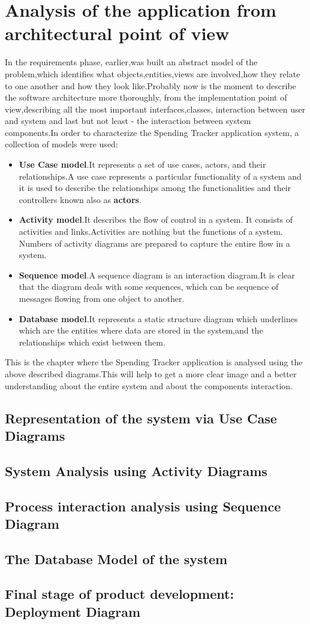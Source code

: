 \section{ Analysis of the application from architectural point of view}
In the requirements phase, earlier,was built an abstract model of the problem,which identifies what objects,entities,views are involved,how they relate to one another and how they look like.Probably now is the moment to describe the software architecture more thoroughly, from the implementation point of view,describing all the most important interfaces,classes, interaction between user and system and last but not least - the interaction between system components.In order to characterize the Spending Tracker application system, a collection of models were used:
\begin{itemize}
	\item \textbf{Use Case model}.It represents a set of use cases, actors, and their relationships.A use case represents a particular functionality of a system and it is used to describe the relationships among the functionalities and their controllers known also as \textbf{actors}.
	\item \textbf{Activity model}.It describes the flow of control in a system. It consists of activities and links.Activities are nothing but the functions of a system. Numbers of activity diagrams are prepared to capture the entire flow in a system.
	\item \textbf{Sequence model}.A sequence diagram is an interaction diagram.It is clear that the diagram deals with some sequences, which can be sequence of messages flowing from one object to another.
	\item \textbf{ Database model}.It represents a static structure diagram which underlines which are the entities where data are stored in the system,and the relationships which exist between them. \cite{UML}
\end{itemize}

This is the chapter where the Spending Tracker application is analysed using the above described diagrams.This will help to get a more clear image and a better understanding about the entire system and about the components interaction.

\subsection{Representation of the system via Use Case Diagrams}
\subsection{System Analysis using Activity Diagrams}
\subsection{Process interaction analysis using Sequence Diagram}
\subsection{The Database Model of the system}
\subsection{Final stage of product development: Deployment Diagram}
